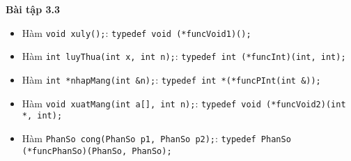 \documentclass[a4paper, 12pt, notitlepage]{article}
\begin{document}
  \textbf{Bài tập 3.3}\\
  \begin{itemize}
    \item Hàm \verb|void xuly();|: \verb|typedef void (*funcVoid1)();|
    \item Hàm \verb|int luyThua(int x, int n);|: \verb|typedef int (*funcInt)(int, int);|
    \item Hàm \verb|int *nhapMang(int &n);|: \verb|typedef int *(*funcPInt(int &));|
    \item Hàm \verb|void xuatMang(int a[], int n);|: \verb|typedef void (*funcVoid2)(int *, int);|
    \item Hàm \verb|PhanSo cong(PhanSo p1, PhanSo p2);|: \verb|typedef PhanSo (*funcPhanSo)(PhanSo, PhanSo);|
  \end{itemize}
  
\end{document}

